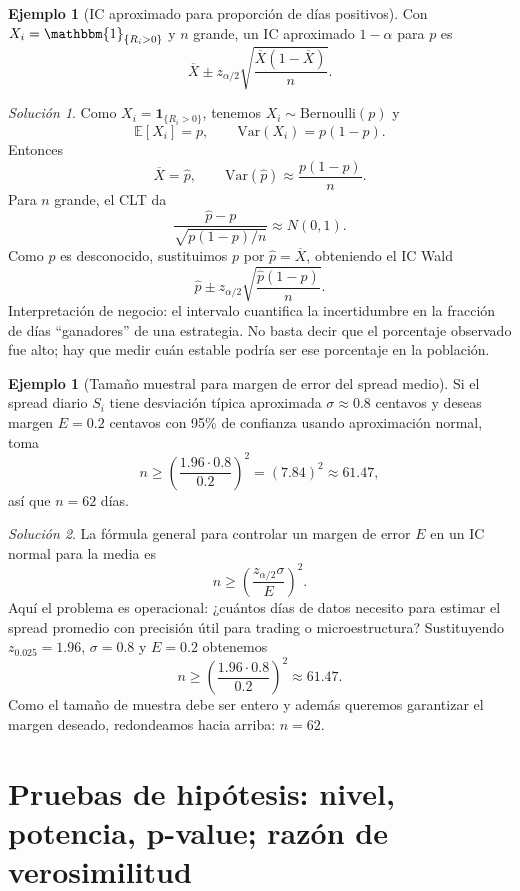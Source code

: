 \documentclass[11pt]{article}
\theoremstyle{plain}
\theoremstyle{definition}
\newtheorem{example}[theorem]{Ejemplo}
\theoremstyle{remark}
\theoremstyle{solstyle}
\newtheorem*{solution}{Solución}
\newcommand{\E}{\mathbb{E}}
\newcommand{\Var}{\mathrm{Var}}
\newcommand{\1}{\mathbbm{1}}
\begin{document}
\begin{example}[IC aproximado para proporción de días positivos]
Con $X_i=\1_{\{R_i>0\}}$ y $n$ grande, un IC aproximado $1-\alpha$ para $p$ es
\[
\overline X \pm z_{\alpha/2}\sqrt{\frac{\overline X(1-\overline X)}{n}}.
\]
\end{example}

\begin{solution}
Como $X_i=\mathbf{1}_{\{R_i>0\}}$, tenemos $X_i\sim \mathrm{Bernoulli}(p)$ y
\[
\E[X_i]=p,\qquad \Var(X_i)=p(1-p).
\]
Entonces
\[
\overline X=\widehat p,\qquad \Var(\widehat p)\approx \frac{p(1-p)}{n}.
\]
Para $n$ grande, el CLT da
\[
\frac{\widehat p-p}{\sqrt{p(1-p)/n}}\approx N(0,1).
\]
Como $p$ es desconocido, sustituimos $p$ por $\widehat p=\overline X$, obteniendo el IC Wald
\[
\widehat p \pm z_{\alpha/2}\sqrt{\frac{\widehat p(1-\widehat p)}{n}}.
\]
Interpretación de negocio: el intervalo cuantifica la incertidumbre en la fracción de días ``ganadores'' de una estrategia. No basta decir que el porcentaje observado fue alto; hay que medir cuán estable podría ser ese porcentaje en la población.
\end{solution}

\begin{example}[Tamaño muestral para margen de error del spread medio]
Si el spread diario $S_i$ tiene desviación típica aproximada $\sigma\approx 0.8$ centavos
y deseas margen $E=0.2$ centavos con 95\% de confianza usando aproximación normal, toma
\[
n\ge \left(\frac{1.96\cdot 0.8}{0.2}\right)^2 = (7.84)^2 \approx 61.47,
\]
así que $n=62$ días.
\end{example}

\begin{solution}
La fórmula general para controlar un margen de error $E$ en un IC normal para la media es
\[
n\ge \left(\frac{z_{\alpha/2}\sigma}{E}\right)^2.
\]
Aquí el problema es operacional: ¿cuántos días de datos necesito para estimar el spread promedio con precisión útil para trading o microestructura? Sustituyendo $z_{0.025}=1.96$, $\sigma=0.8$ y $E=0.2$ obtenemos
\[
n\ge \left(\frac{1.96\cdot 0.8}{0.2}\right)^2\approx 61.47.
\]
Como el tamaño de muestra debe ser entero y además queremos garantizar el margen deseado, redondeamos hacia arriba: $n=62$.
\end{solution}

\section{Pruebas de hipótesis: nivel, potencia, p-value; razón de verosimilitud}
\end{document}
